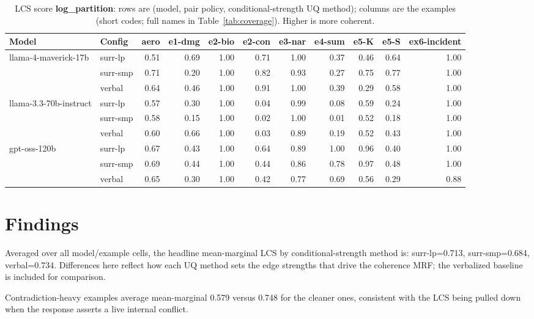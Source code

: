 \documentclass[11pt]{article}
\begin{document}
\begin{table}[htbp]
\centering
\footnotesize
\setlength{\tabcolsep}{3.5pt}
\caption{LCS score \textbf{log\_partition}: rows are (model, pair policy, conditional-strength UQ method); columns are the examples (short codes; full names in Table~\ref{tab:coverage}). Higher is more coherent.}
\label{tab:log-partition}
\begin{tabular}{llrrrrrrrrr}
\toprule
\textbf{Model} & \textbf{Config} & \textbf{aero} & \textbf{e1-dmg} & \textbf{e2-bio} & \textbf{e2-con} & \textbf{e3-nar} & \textbf{e4-sum} & \textbf{e5-K} & \textbf{e5-S} & \textbf{ex6-incident} \\
\midrule
llama-4-maverick-17b & surr-lp & 0.51 & 0.69 & 1.00 & 0.71 & 1.00 & 0.37 & 0.46 & 0.64 & 1.00 \\
 & surr-smp & 0.71 & 0.20 & 1.00 & 0.82 & 0.93 & 0.27 & 0.75 & 0.77 & 1.00 \\
 & verbal & 0.64 & 0.46 & 1.00 & 0.91 & 1.00 & 0.39 & 0.29 & 0.58 & 1.00 \\
\midrule
llama-3.3-70b-instruct & surr-lp & 0.57 & 0.30 & 1.00 & 0.04 & 0.99 & 0.08 & 0.59 & 0.24 & 1.00 \\
 & surr-smp & 0.58 & 0.15 & 1.00 & 0.02 & 1.00 & 0.01 & 0.52 & 0.18 & 1.00 \\
 & verbal & 0.60 & 0.66 & 1.00 & 0.03 & 0.89 & 0.19 & 0.52 & 0.43 & 1.00 \\
\midrule
gpt-oss-120b & surr-lp & 0.67 & 0.43 & 1.00 & 0.64 & 0.89 & 1.00 & 0.96 & 0.40 & 1.00 \\
 & surr-smp & 0.69 & 0.44 & 1.00 & 0.44 & 0.86 & 0.78 & 0.97 & 0.48 & 1.00 \\
 & verbal & 0.65 & 0.30 & 1.00 & 0.42 & 0.77 & 0.69 & 0.56 & 0.29 & 0.88 \\
\bottomrule
\end{tabular}
\end{table}


\section{Findings}

Averaged over all model/example cells, the headline mean-marginal LCS by conditional-strength method is: surr-lp=0.713, surr-smp=0.684, verbal=0.734. Differences here reflect how each UQ method sets the edge strengths that drive the coherence MRF; the verbalized baseline is included for comparison.

Contradiction-heavy examples average mean-marginal 0.579 versus 0.748 for the cleaner ones, consistent with the LCS being pulled down when the response asserts a live internal conflict.
\end{document}
